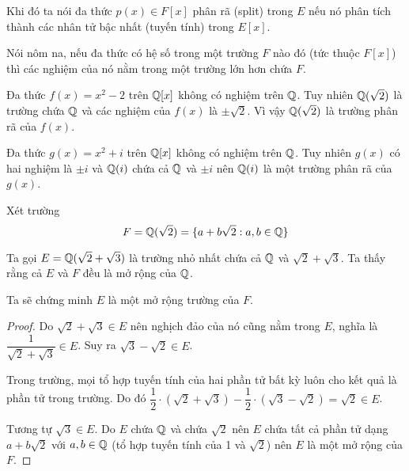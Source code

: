 Khi đó ta nói đa thức $p(x) \in F[x]$ phân rã (split) trong $E$ nếu nó phân tích thành các nhân tử bậc nhất (tuyến tính) trong $E[x]$.

Nói nôm na, nếu đa thức có hệ số trong một trường $F$ nào đó (tức thuộc $F[x]$) thì các nghiệm của nó nằm trong một trường lớn hơn chứa $F$.

\begin{example}
    Đa thức $f(x) = x^2 - 2$ trên $\mathbb{Q}[x]$ không có nghiệm trên $\mathbb{Q}$. Tuy nhiên $\mathbb{Q}(\sqrt{2})$ là trường chứa $\mathbb{Q}$ và các nghiệm của $f(x)$ là $\pm \sqrt{2}$. Vì vậy $\mathbb{Q}(\sqrt{2})$ là trường phân rã của $f(x)$.
\end{example}

\begin{example}
    Đa thức $g(x) = x^2 + i$ trên $\mathbb{Q}[x]$ không có nghiệm trên $\mathbb{Q}$. Tuy nhiên $g(x)$ có hai nghiệm là $\pm i$ và $\mathbb{Q}(i)$ chứa cả $\mathbb{Q}$ và $\pm i$ nên $\mathbb{Q}(i)$ là một trường phân rã của $g(x)$.
\end{example}

\begin{example}
    Xét trường
    \begin{equation*}
        F = \mathbb{Q}(\sqrt{2}) = \{ a + b  \sqrt{2}: a, b \in \mathbb{Q}\}
    \end{equation*}

    Ta gọi $E = \mathbb{Q}(\sqrt{2} + \sqrt{3})$ là trường nhỏ nhất chứa cả $\mathbb{Q}$ và $\sqrt{2} + \sqrt{3}$. Ta thấy rằng cả $E$ và $F$ đều là mở rộng của $\mathbb{Q}$.

    Ta sẽ chứng minh $E$ là một mở rộng trường của $F$.

    \begin{proof}
        Do $\sqrt{2} + \sqrt{3} \in E$ nên nghịch đảo của nó cũng nằm trong $E$, nghĩa là $\dfrac{1}{\sqrt{2} + \sqrt{3}} \in E$. Suy ra $\sqrt{3} - \sqrt{2} \in E$.

        Trong trường, mọi tổ hợp tuyến tính của hai phần tử bất kỳ luôn cho kết quả là phần tử trong trường. Do đó $\dfrac{1}{2} \cdot (\sqrt{2} + \sqrt{3}) - \dfrac{1}{2} \cdot (\sqrt{3} - \sqrt{2}) = \sqrt{2} \in E$.

        Tương tự $\sqrt{3} \in E$. Do $E$ chứa $\mathbb{Q}$ và chứa $\sqrt{2}$ nên $E$ chứa tất cả phần tử dạng $a + b \sqrt{2}$ với $a, b \in \mathbb{Q}$ (tổ hợp tuyến tính của 1 và $\sqrt{2}$) nên $E$ là một mở rộng của $F$.
    \end{proof}
\end{example}


